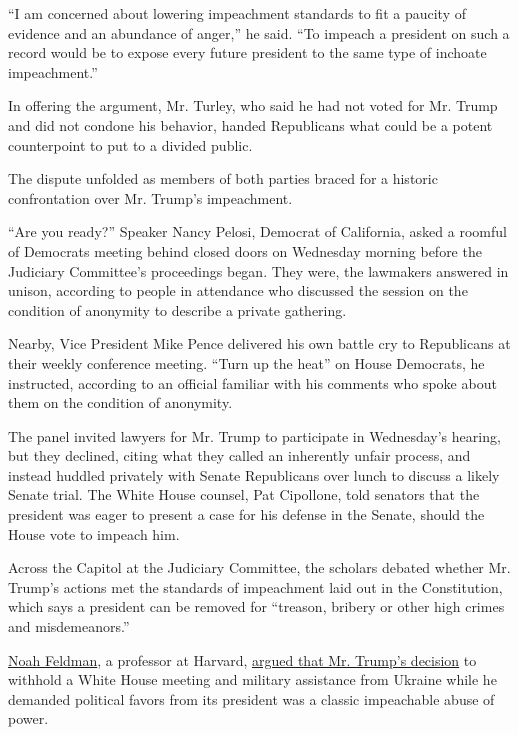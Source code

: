 ``I am concerned about lowering impeachment standards to fit a paucity
of evidence and an abundance of anger,'' he said. ``To impeach a
president on such a record would be to expose every future president to
the same type of inchoate impeachment.''

In offering the argument, Mr. Turley, who said he had not voted for Mr.
Trump and did not condone his behavior, handed Republicans what could be
a potent counterpoint to put to a divided public.

The dispute unfolded as members of both parties braced for a historic
confrontation over Mr. Trump's impeachment.

``Are you ready?'' Speaker Nancy Pelosi, Democrat of California, asked a
roomful of Democrats meeting behind closed doors on Wednesday morning
before the Judiciary Committee's proceedings began. They were, the
lawmakers answered in unison, according to people in attendance who
discussed the session on the condition of anonymity to describe a
private gathering.

Nearby, Vice President Mike Pence delivered his own battle cry to
Republicans at their weekly conference meeting. ``Turn up the heat'' on
House Democrats, he instructed, according to an official familiar with
his comments who spoke about them on the condition of anonymity.

The panel invited lawyers for Mr. Trump to participate in Wednesday's
hearing, but they declined, citing what they called an inherently unfair
process, and instead huddled privately with Senate Republicans over
lunch to discuss a likely Senate trial. The White House counsel, Pat
Cipollone, told senators that the president was eager to present a case
for his defense in the Senate, should the House vote to impeach him.

Across the Capitol at the Judiciary Committee, the scholars debated
whether Mr. Trump's actions met the standards of impeachment laid out in
the Constitution, which says a president can be removed for ``treason,
bribery or other high crimes and misdemeanors.''

\href{https://www.nytimes3xbfgragh.onion/2019/12/04/us/politics/noah-feldman.html}{Noah
Feldman}, a professor at Harvard,
\href{https://int.graylady3jvrrxbe.onion/data/documenthelper/6550-noah-feldman-testimony/8457c4c46d96010b546e/optimized/full.pdf\#page=1}{argued
that Mr. Trump's decision} to withhold a White House meeting and
military assistance from Ukraine while he demanded political favors from
its president was a classic impeachable abuse of power.

